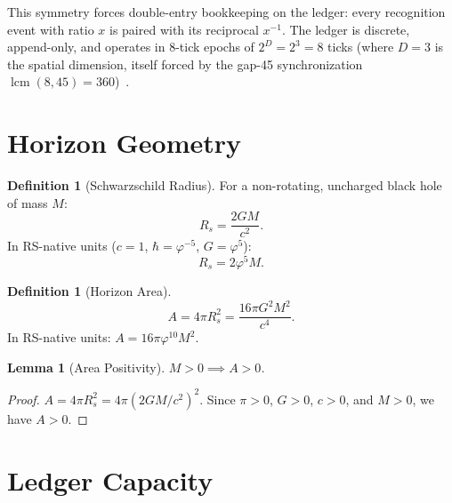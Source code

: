 \documentclass[12pt,a4paper]{article}
\newtheorem{lemma}[theorem]{Lemma}
\theoremstyle{definition}
\newtheorem{definition}[theorem]{Definition}
\theoremstyle{remark}
\begin{document}
This symmetry forces double-entry bookkeeping on the ledger:
every recognition event with ratio $x$ is paired with its
reciprocal $x^{-1}$.  The ledger is discrete, append-only,
and operates in 8-tick epochs of $2^D = 2^3 = 8$ ticks
(where $D = 3$ is the spatial dimension, itself forced by the
gap-45 synchronization $\operatorname{lcm}(8,45) = 360$)~\cite{RS_Axioms}.

\section{Horizon Geometry}
\label{sec:geometry}

\begin{definition}[Schwarzschild Radius]
For a non-rotating, uncharged black hole of mass $M$:
\begin{equation}
  R_s = \frac{2GM}{c^2}.
  \label{eq:Rs}
\end{equation}
In RS-native units ($c = 1$, $\hbar = \varphi^{-5}$,
$G = \varphi^5$):
\begin{equation}
  R_s = 2\varphi^5 M.
\end{equation}
\end{definition}

\begin{definition}[Horizon Area]
\label{def:area}
\begin{equation}
  A = 4\pi R_s^2 = \frac{16\pi G^2 M^2}{c^4}.
  \label{eq:area}
\end{equation}
In RS-native units:
$A = 16\pi\varphi^{10} M^2$.
\end{definition}

\begin{lemma}[Area Positivity]
\label{lem:area-pos}
$M > 0 \implies A > 0$.
\end{lemma}

\begin{proof}
$A = 4\pi R_s^2 = 4\pi(2GM/c^2)^2$.  Since $\pi > 0$,
$G > 0$, $c > 0$, and $M > 0$, we have $A > 0$.
\end{proof}

\section{Ledger Capacity}
\label{sec:capacity}
\end{document}
